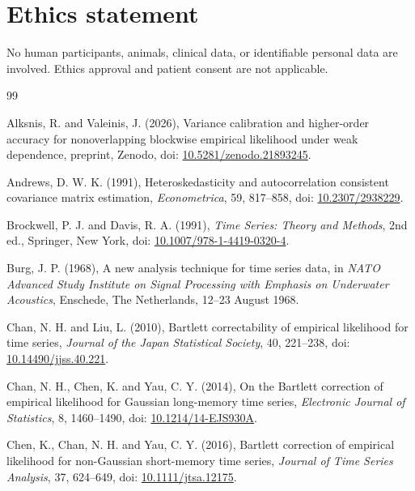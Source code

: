 \documentclass[12pt]{article}
\theoremstyle{remark}
\begin{document}
\section*{Ethics statement}
No human participants, animals, clinical data, or identifiable personal data are involved. Ethics approval and patient consent are not applicable.

\begin{thebibliography}{99}

Alksnis, R. and Valeinis, J. (2026), Variance calibration and higher-order accuracy for nonoverlapping blockwise empirical likelihood under weak dependence, preprint, Zenodo, doi: \href{https://doi.org/10.5281/zenodo.21893245}{10.5281/zenodo.21893245}.

Andrews, D. W. K. (1991), Heteroskedasticity and autocorrelation consistent covariance matrix estimation, \emph{Econometrica}, 59, 817--858, doi: \href{https://doi.org/10.2307/2938229}{10.2307/2938229}.

Brockwell, P. J. and Davis, R. A. (1991), \emph{Time Series: Theory and Methods}, 2nd ed., Springer, New York, doi: \href{https://doi.org/10.1007/978-1-4419-0320-4}{10.1007/978-1-4419-0320-4}.

Burg, J. P. (1968), A new analysis technique for time series data, in \emph{NATO Advanced Study Institute on Signal Processing with Emphasis on Underwater Acoustics}, Enschede, The Netherlands, 12--23 August 1968.

Chan, N. H. and Liu, L. (2010), Bartlett correctability of empirical likelihood for time series, \emph{Journal of the Japan Statistical Society}, 40, 221--238, doi: \href{https://doi.org/10.14490/jjss.40.221}{10.14490/jjss.40.221}.

Chan, N. H., Chen, K. and Yau, C. Y. (2014), On the Bartlett correction of empirical likelihood for Gaussian long-memory time series, \emph{Electronic Journal of Statistics}, 8, 1460--1490, doi: \href{https://doi.org/10.1214/14-EJS930A}{10.1214/14-EJS930A}.

Chen, K., Chan, N. H. and Yau, C. Y. (2016), Bartlett correction of empirical likelihood for non-Gaussian short-memory time series, \emph{Journal of Time Series Analysis}, 37, 624--649, doi: \href{https://doi.org/10.1111/jtsa.12175}{10.1111/jtsa.12175}.


\end{thebibliography}
\end{document}

